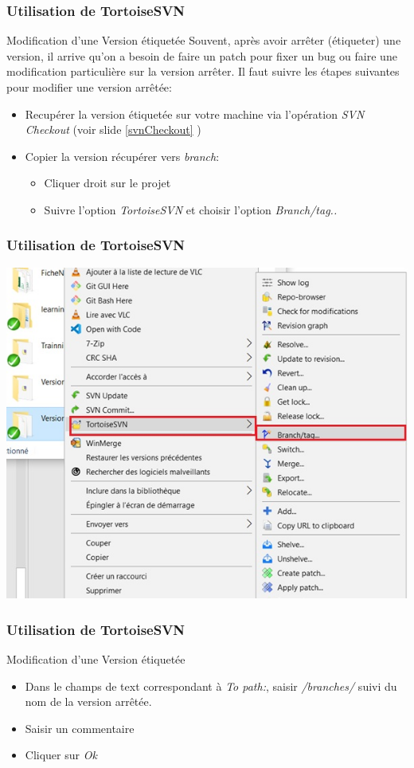\documentclass{beamer}
\begin{document}
\begin{frame}
\frametitle{Utilisation de TortoiseSVN}

\begin{block}{Modification d'une Version étiquetée}
Souvent, après avoir arrêter (étiqueter) une version, il arrive qu'on a  besoin de faire un patch pour fixer un bug ou faire une modification particulière sur la version arrêter.  Il faut suivre les étapes suivantes pour modifier une version arrêtée:
\begin{itemize}
\item Recupérer la version étiquetée sur votre machine via l'opération \alert{\textit{SVN Checkout}} (voir slide \ref{svnCheckout} )
\item Copier la version récupérer vers \alert{\textit{branch}}:
\begin{itemize}
\item Cliquer droit sur le projet
\item Suivre l'option \alert{\textit{TortoiseSVN}} et choisir l'option \alert{\textit{Branch/tag..}}
\end{itemize}
\end{itemize}
\end{block}
\end{frame}

\begin{frame}
\frametitle{Utilisation de TortoiseSVN}
\includegraphics[scale=.7]{../images/etiquetage1.jpg}
\end{frame}

\begin{frame}
\frametitle{Utilisation de TortoiseSVN}
\begin{block}{Modification d'une Version étiquetée}
\begin{itemize}
\item Dans le champs de text correspondant à \alert{\textit{To path:}}, saisir \alert{\textit{/branches/}} suivi du nom de la version arrêtée.
\item Saisir un commentaire
\item Cliquer sur \alert{\textit{Ok}}
\end{itemize}
\end{block}
\end{frame}
\end{document}
